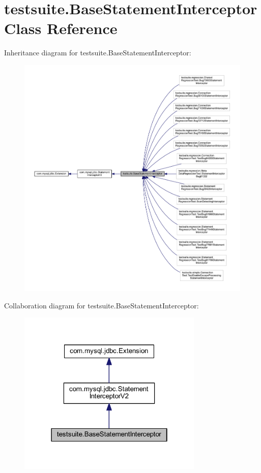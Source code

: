 \hypertarget{classtestsuite_1_1_base_statement_interceptor}{}\section{testsuite.\+Base\+Statement\+Interceptor Class Reference}
\label{classtestsuite_1_1_base_statement_interceptor}


Inheritance diagram for testsuite.\+Base\+Statement\+Interceptor\+:
\nopagebreak
\begin{figure}[H]
\begin{center}
\leavevmode
\includegraphics[width=350pt]{classtestsuite_1_1_base_statement_interceptor__inherit__graph}
\end{center}
\end{figure}


Collaboration diagram for testsuite.\+Base\+Statement\+Interceptor\+:
\nopagebreak
\begin{figure}[H]
\begin{center}
\leavevmode
\includegraphics[width=250pt]{classtestsuite_1_1_base_statement_interceptor__coll__graph}
\end{center}
\end{figure}

